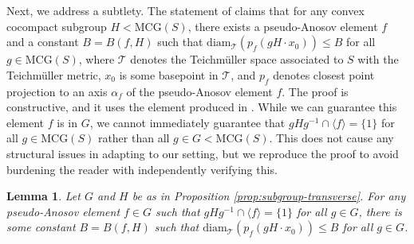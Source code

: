 \documentclass[11pt,letterpaper]{amsart}
\newtheorem{lemma}[theorem]{Lemma}
\theoremstyle{definition}
\theoremstyle{plain}
\theoremstyle{TheoremNum}
\begin{document}
Next, we address a subtlety. The statement of \cite[Lemma~6.7]{Abbott-Hull} claims that for any convex cocompact subgroup $H < \text{MCG}(S)$, there exists a pseudo-Anosov element $f$ and a constant $B= B(f,H)$ such that $\text{diam}_{\mathcal{T}}(p_f (gH\cdot x_0)) \leq B$ for all $g \in \text{MCG}(S)$, where $\mathcal{T}$ denotes the Teichm\"{u}ller space associated to $S$ with the Teichm\"{u}ller metric, $x_0$ is some basepoint in $\mathcal{T}$, and $p_f$ denotes closest point projection to an axis $\alpha_f$ of the pseudo-Anosov element $f$. The proof is constructive, and it uses the element produced in \cite[Theorem~5.1]{Abbott-Hull}. While we can guarantee this element $f$ is in $G$, we cannot immediately guarantee that $g H g^{-1} \cap \langle f \rangle = \{1\}$ for all $g \in \text{MCG}(S)$ rather than all $g \in G < \text{MCG}(S)$. This does not cause any structural issues in adapting \cite[Lemma~6.7]{Abbott-Hull} to our setting, but we reproduce the proof to avoid burdening the reader with independently verifying this.
\begin{lemma}\label{lem:5.6-analogue}
    Let $G$ and $H$ be as in Proposition \ref{prop:subgroup-transverse}. For any pseudo-Anosov element $f \in G$ such that $g H g^{-1} \cap \langle f \rangle = \{1\}$ for all $g \in G$, there is some constant $B = B(f,H)$ such that $\text{diam}_{\mathcal{T}}(p_f (gH\cdot x_0)) \leq B$ for all $g \in G$.
\end{lemma}
\end{document}
